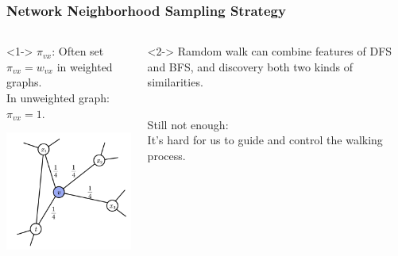 \documentclass[10pt, aspectratio=169]{beamer}
\begin{document}
\begin{frame}
    \frametitle{Network Neighborhood Sampling Strategy}
    \begin{columns}
        \begin{column}{0.5\textwidth}<1->
            $\pi_{vx}$: Often set $\pi_{vx}=w_{vx}$ in weighted graphs.\\
            In unweighted graph: $\pi_{vx}=1$.
            \begin{center}
                \includegraphics[width=5cm]{./graphics/Randomwalk.png}
            \end{center}
        \end{column}
        \begin{column}{0.5\textwidth}<2->
            Ramdom walk can combine features of DFS and BFS, and discovery both two kinds of similarities.\par ~\\
            Still not enough:\\
            It’s hard for us to guide and control the walking process.
        \end{column}
    \end{columns}
\end{frame}
\end{document}

